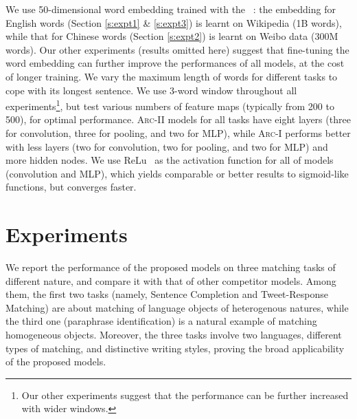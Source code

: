 \documentclass{article} \usepackage{nips14submit_e,times}
\newcommand{\0}{\ensuremath{\mathbf{0}}}
\newcommand{\1}{\ensuremath{\mathbf{1}}}
\begin{document}
We use 50-dimensional word embedding trained with the ~\cite{word2vec}: the embedding for English words (Section \ref{s:expt1} \& \ref{s:expt3}) is learnt on Wikipedia (1B words), while that for Chinese words (Section \ref{s:expt2}) is learnt on Weibo data (300M words). Our other experiments (results omitted here) suggest that fine-tuning the word embedding can further improve the performances of all models, at the cost of longer training. We vary the maximum length of words for different tasks to cope with its longest sentence. We use 3-word window throughout all experiments\footnote{Our other experiments suggest that the performance can be further increased with wider windows.}, but test various numbers of feature maps (typically from 200 to 500), for optimal performance. \textsc{Arc-II} models for all tasks have eight layers (three for convolution, three for pooling, and two for MLP), while \textsc{Arc-I} performs better with less layers (two for convolution, two for pooling, and two for MLP) and more hidden nodes.  We use ReLu~\cite{relu} as the activation function for all of models (convolution and MLP), which yields comparable or better results to sigmoid-like functions, but converges faster. \vspace{-10pt}

\section{Experiments} \label{s:expts} \vspace{-10pt}
We report the performance of the proposed models on three matching tasks of different nature, and compare it with that of other competitor models. Among them, the first two tasks (namely, Sentence Completion and Tweet-Response Matching) are about matching of language objects of heterogenous natures, while the third one (paraphrase identification) is a natural example of matching homogeneous objects. Moreover, the three tasks involve two languages, different types of matching, and distinctive writing styles, proving the broad applicability of the proposed models. \vspace{-10pt}
\end{document}
